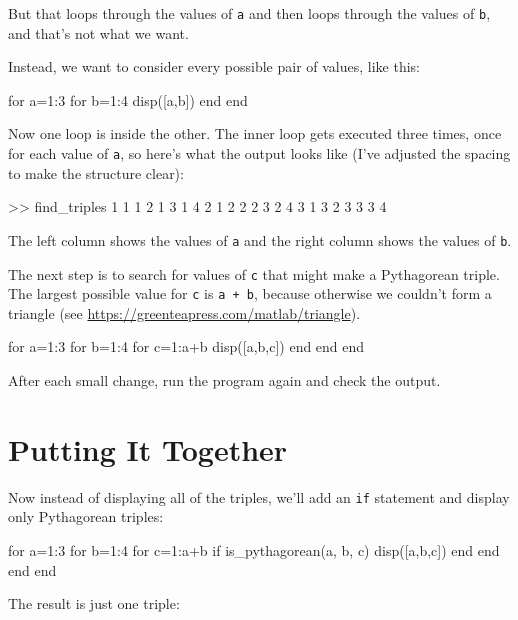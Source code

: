 \documentclass[../../book.tex]{subfiles}
\begin{document}
But that loops through the values of \lstinline{a} and then loops through the values of \lstinline{b}, and that's not what we want.

Instead, we want to consider every possible pair of values, like this:

\begin{code}
for a=1:3
    for b=1:4
        disp([a,b])
    end
end
\end{code}

Now one loop is inside the other.  The inner loop gets executed three times, once for each value of \lstinline{a}, so here's what the output looks like (I've adjusted the spacing to make the structure clear):

\begin{code}
>> find_triples
     1     1
     1     2
     1     3
     1     4
     2     1
     2     2
     2     3
     2     4
     3     1
     3     2
     3     3
     3     4
\end{code}

The left column shows the values of \lstinline{a} and the right column shows the values of \lstinline{b}.

The next step is to search for values of \lstinline{c} that might make a Pythagorean triple.  The largest possible value for \lstinline{c} is \lstinline{a + b}, because otherwise we couldn't form a triangle
(see \url{https://greenteapress.com/matlab/triangle}).

\begin{code}
for a=1:3
    for b=1:4
        for c=1:a+b
            disp([a,b,c])
        end
    end
end
\end{code}

After each small change, run the program again and check the output.

\section{Putting It Together}

Now instead of displaying all of the triples, we'll add an \lstinline{if} statement and display only Pythagorean triples:

\begin{code}
for a=1:3
    for b=1:4
        for c=1:a+b
            if is_pythagorean(a, b, c)
                disp([a,b,c])
            end
        end
    end
end
\end{code}

The result is just one triple:
\end{document}
